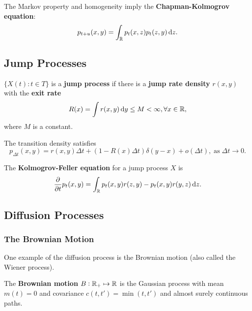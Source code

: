 \begin{theorem}
    The Markov property and homogeneity imply the \textbf{Chapman-Kolmogrov equation}:
    \begin{equation*}
        p_{t+u}(x,y) = \int_\mbb{R} p_t(x, z) p_t(z, y) \dif z.
    \end{equation*}
\end{theorem}

\subsection{Jump Processes}

\begin{definition}
    $\{X(t): t\in T\}$ is a \textbf{jump process} if there is a \textbf{jump rate density} $r(x,y)$ with the \textbf{exit rate}
    \begin{equation*}
        R(x) = \int r(x,y) \dif y \le M < \infty, \forall x \in \mbb{R},
    \end{equation*}
    where $M$ is a constant.

    The transition density satisfies
    \begin{equation*}
        p_{\Delta t} (x,y) = r(x,y) \Delta t + (1-R(x)\Delta t) \delta (y-x) + o(\Delta t), \; \text{as} \; \Delta t \to 0.
    \end{equation*}
\end{definition}

\begin{theorem}
    The \textbf{Kolmogrov-Feller equation} for a jump process $X$ is 
    \begin{equation*}
        \frac{\partial}{\partial t} p_t(x,y) = \int_\mbb{R} p_t(x,y) r(z, y) - p_t(x,y) r(y,z) \dif z.
    \end{equation*}
\end{theorem}

\subsection{Diffusion Processes}

\subsubsection{The Brownian Motion}

One example of the diffusion process is the Brownian motion (also called the Wiener process).
\begin{definition}
    The \textbf{Brownian motion} $B: \mathbb{R}_+ \mapsto \mathbb{R}$ is the Gaussian process with mean $m(t) = 0$ and covariance $c(t,t') = \min (t, t')$ and almost surely continuous paths.
\end{definition}

